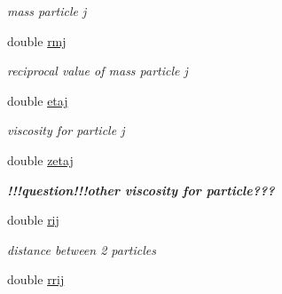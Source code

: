 \begin{CompactItemize}
\begin{CompactList}\small\item\em mass particle j \item\end{CompactList}\item 
\hypertarget{classInteraction_fbdcead1ee80174b4d98952a12763e31}{
double \hyperlink{classInteraction_fbdcead1ee80174b4d98952a12763e31}{rmj}}
\label{classInteraction_fbdcead1ee80174b4d98952a12763e31}

\begin{CompactList}\small\item\em reciprocal value of mass particle j \item\end{CompactList}\item 
\hypertarget{classInteraction_af810b6d29f848738dc472d0bf1dd5f5}{
double \hyperlink{classInteraction_af810b6d29f848738dc472d0bf1dd5f5}{etaj}}
\label{classInteraction_af810b6d29f848738dc472d0bf1dd5f5}

\begin{CompactList}\small\item\em viscosity for particle j \item\end{CompactList}\item 
\hypertarget{classInteraction_fec2d2babd85fff5f6e54e41aa65a862}{
double \hyperlink{classInteraction_fec2d2babd85fff5f6e54e41aa65a862}{zetaj}}
\label{classInteraction_fec2d2babd85fff5f6e54e41aa65a862}

\begin{CompactList}\small\item\em {\bf !!!question!!!{\bf other viscosity for particle??? }}\item\end{CompactList}\item 
\hypertarget{classInteraction_d2a06f46206fe80c305c39320ec693f3}{
double \hyperlink{classInteraction_d2a06f46206fe80c305c39320ec693f3}{rij}}
\label{classInteraction_d2a06f46206fe80c305c39320ec693f3}

\begin{CompactList}\small\item\em distance between 2 particles \item\end{CompactList}\item 
\hypertarget{classInteraction_85655b8499e012ca1abfbe441b9cd877}{
double \hyperlink{classInteraction_85655b8499e012ca1abfbe441b9cd877}{rrij}}
\label{classInteraction_85655b8499e012ca1abfbe441b9cd877}


\end{CompactItemize}
